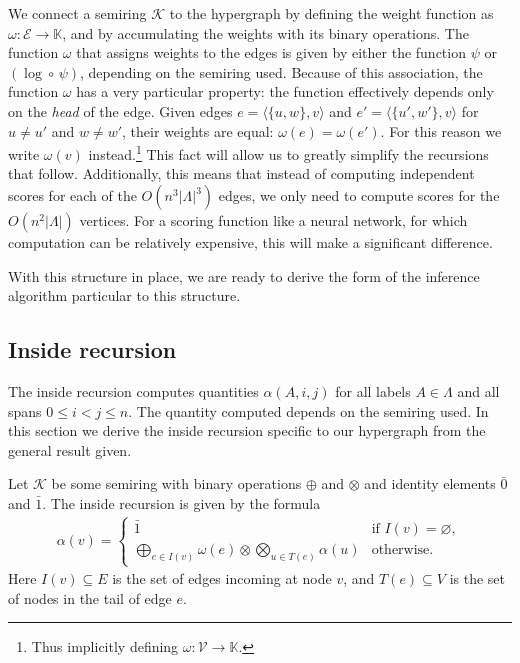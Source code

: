     We connect a semiring $\mathcal{K}$ to the hypergraph by defining the weight function as $\omega: \mathcal{E} \to \mathbb{K}$, and by accumulating the weights with its binary operations. The function $\omega$ that assigns weights to the edges is given by either the function $\psi$ or $(\log \circ \, \psi)$, depending on the semiring used. Because of this association, the function $\omega$ has a very particular property: the function effectively depends only on the \textit{head} of the edge. Given edges $e = \langle \{ u, w \}, v \rangle$ and $e' =  \langle \{ u', w' \}, v \rangle$ for $u \neq u'$ and $w \neq w'$, their weights are equal: $\omega(e) = \omega(e')$. For this reason we write $\omega(v)$ instead.\footnote{Thus implicitly defining $\omega: \mathcal{V} \to \mathbb{K}$.} This fact will allow us to greatly simplify the recursions that follow. Additionally, this means that instead of computing independent scores for each of the $O(n^3 \vert\Lambda\rvert^3)$ edges, we only need to compute scores for the $O(n^2 \vert\Lambda\rvert)$ vertices. For a scoring function like a neural network, for which computation can be relatively expensive, this will make a significant difference.

   With this structure in place, we are ready to derive the form of the inference algorithm particular to this structure.

  \subsection{Inside recursion}
    The inside recursion computes quantities $\alpha(A,i,j)$ for all labels $A \in \Lambda$ and all spans $0 \leq i < j \leq n$. The quantity computed depends on the semiring used. In this section we derive the inside recursion specific to our hypergraph from the general result given.

    Let $\mathcal{K}$ be some semiring with binary operations $\oplus$ and $\otimes$ and identity elements $\bar{0}$ and $\bar{1}$. The inside recursion is given by the formula \citep{goodman1999semiring}
    \begin{align*}
      \alpha(v) =
        \begin{cases}
          \bar{1}  &  \mbox{if } I(v) = \varnothing,  \\
          \displaystyle\bigoplus_{e \in I(v)} \omega(e) \otimes \displaystyle\bigotimes_{u \in T(e)} \alpha(u)  & \mbox{otherwise.}
        \end{cases}
    \end{align*}
    Here $I(v) \subseteq E$ is the set of edges incoming at node $v$, and $T(e) \subseteq V$ is the set of nodes in the tail of edge $e$.


